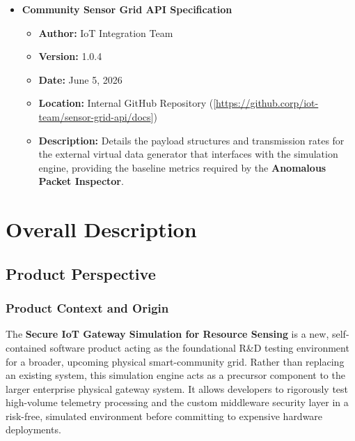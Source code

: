 \documentclass[12pt,letterpaper]{article}
\begin{document}
\begin{itemize}
\begin{itemize}
\item \textbf{Date:} January 10, 2026
\item \textbf{Location:} Central Engineering Wiki ([\url{https://wiki.corp/security/privacy-guidelines-v3}])
\item \textbf{Description:} Dictates the specific regulatory requirements and internal protocols used by the \textbf{Privacy Anonymizer} pipeline to successfully strip personally identifiable geolocation metadata.
\end{itemize}
\item \textbf{Community Sensor Grid API Specification}
\begin{itemize}
\item \textbf{Author:} IoT Integration Team
\item \textbf{Version:} 1.0.4
\item \textbf{Date:} June 5, 2026
\item \textbf{Location:} Internal GitHub Repository ([\url{https://github.corp/iot-team/sensor-grid-api/docs}])
\item \textbf{Description:} Details the payload structures and transmission rates for the external virtual data generator that interfaces with the simulation engine, providing the baseline metrics required by the \textbf{Anomalous Packet Inspector}.
\end{itemize}
\end{itemize}
\vspace{0.08in}
\section{Overall Description}
\subsection{Product Perspective}
\subsubsection{Product Context and Origin}
The \textbf{Secure IoT Gateway Simulation for Resource Sensing} is a new, self-contained software product acting as the foundational R\&D testing environment for a broader, upcoming physical smart-community grid. Rather than replacing an existing system, this simulation engine acts as a precursor component to the larger enterprise physical gateway system. It allows developers to rigorously test high-volume telemetry processing and the custom middleware security layer in a risk-free, simulated environment before committing to expensive hardware deployments.\par
\end{document}
